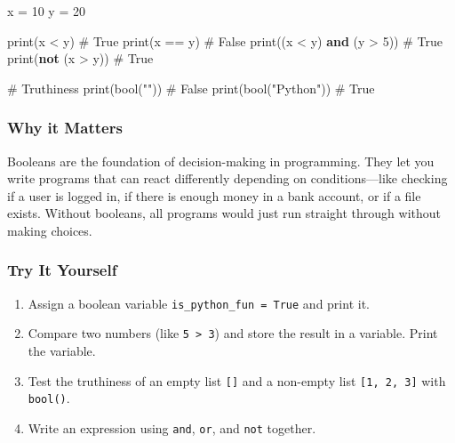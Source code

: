 \documentclass[
  letterpaper,
  DIV=11,
  numbers=noendperiod]{scrreprt}
\newenvironment{Shaded}{\begin{snugshade}}{\end{snugshade}}
\newcommand{\BuiltInTok}[1]{\textcolor[rgb]{0.00,0.23,0.31}{#1}}
\newcommand{\CommentTok}[1]{\textcolor[rgb]{0.37,0.37,0.37}{#1}}
\newcommand{\DecValTok}[1]{\textcolor[rgb]{0.68,0.00,0.00}{#1}}
\newcommand{\KeywordTok}[1]{\textcolor[rgb]{0.00,0.23,0.31}{\textbf{#1}}}
\newcommand{\NormalTok}[1]{\textcolor[rgb]{0.00,0.23,0.31}{#1}}
\newcommand{\OperatorTok}[1]{\textcolor[rgb]{0.37,0.37,0.37}{#1}}
\newcommand{\StringTok}[1]{\textcolor[rgb]{0.13,0.47,0.30}{#1}}
\providecommand{\tightlist}{%
  \setlength{\itemsep}{0pt}\setlength{\parskip}{0pt}}
\begin{document}
\begin{Shaded}
\begin{Highlighting}[]
\NormalTok{x }\OperatorTok{=} \DecValTok{10}
\NormalTok{y }\OperatorTok{=} \DecValTok{20}

\BuiltInTok{print}\NormalTok{(x }\OperatorTok{\textless{}}\NormalTok{ y)          }\CommentTok{\# True}
\BuiltInTok{print}\NormalTok{(x }\OperatorTok{==}\NormalTok{ y)         }\CommentTok{\# False}
\BuiltInTok{print}\NormalTok{((x }\OperatorTok{\textless{}}\NormalTok{ y) }\KeywordTok{and}\NormalTok{ (y }\OperatorTok{\textgreater{}} \DecValTok{5}\NormalTok{))  }\CommentTok{\# True}
\BuiltInTok{print}\NormalTok{(}\KeywordTok{not}\NormalTok{ (x }\OperatorTok{\textgreater{}}\NormalTok{ y))    }\CommentTok{\# True}

\CommentTok{\# Truthiness}
\BuiltInTok{print}\NormalTok{(}\BuiltInTok{bool}\NormalTok{(}\StringTok{""}\NormalTok{))       }\CommentTok{\# False}
\BuiltInTok{print}\NormalTok{(}\BuiltInTok{bool}\NormalTok{(}\StringTok{"Python"}\NormalTok{)) }\CommentTok{\# True}
\end{Highlighting}
\end{Shaded}

\subsubsection{Why it Matters}\label{why-it-matters-8}

Booleans are the foundation of decision-making in programming. They let
you write programs that can react differently depending on
conditions---like checking if a user is logged in, if there is enough
money in a bank account, or if a file exists. Without booleans, all
programs would just run straight through without making choices.

\subsubsection{Try It Yourself}\label{try-it-yourself-8}

\begin{enumerate}
\def\labelenumi{\arabic{enumi}.}
\tightlist
\item
  Assign a boolean variable \texttt{is\_python\_fun\ =\ True} and print
  it.
\item
  Compare two numbers (like \texttt{5\ \textgreater{}\ 3}) and store the
  result in a variable. Print the variable.
\item
  Test the truthiness of an empty list \texttt{{[}{]}} and a non-empty
  list \texttt{{[}1,\ 2,\ 3{]}} with \texttt{bool()}.
\item
  Write an expression using \texttt{and}, \texttt{or}, and \texttt{not}
  together.
\end{enumerate}
\end{document}
